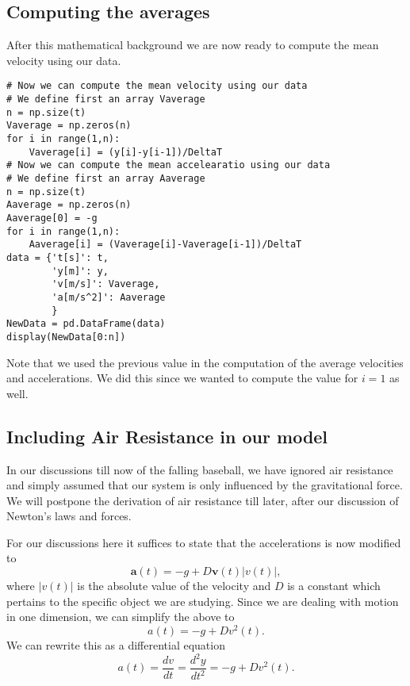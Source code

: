 \documentclass[%
oneside,                 %
final,                   %
10pt]{article}
\begin{document}
\subsection*{Computing the averages}
After this mathematical background we are now ready to compute the mean velocity using our data.





















\begin{verbatim}
# Now we can compute the mean velocity using our data
# We define first an array Vaverage
n = np.size(t)
Vaverage = np.zeros(n)
for i in range(1,n):
    Vaverage[i] = (y[i]-y[i-1])/DeltaT
# Now we can compute the mean accelearatio using our data
# We define first an array Aaverage
n = np.size(t)
Aaverage = np.zeros(n)
Aaverage[0] = -g
for i in range(1,n):
    Aaverage[i] = (Vaverage[i]-Vaverage[i-1])/DeltaT
data = {'t[s]': t,
        'y[m]': y,
        'v[m/s]': Vaverage,
        'a[m/s^2]': Aaverage
        }
NewData = pd.DataFrame(data)
display(NewData[0:n])

\end{verbatim}


Note that we used the previous value in the computation of the average velocities and accelerations. We did this since we wanted to compute the value for $i=1$ as well. 

\subsection*{Including Air Resistance in our model}

In our discussions till now of the falling baseball, we have ignored
air resistance and simply assumed that our system is only influenced
by the gravitational force.  We will postpone the derivation of air
resistance till later, after our discussion of Newton's laws and
forces.

For our discussions here it suffices to state that the accelerations is now modified to
\[
\bm{a}(t) = -g +D\bm{v}(t)\vert v(t)\vert,
\]
where $\vert v(t)\vert$ is the absolute value of the velocity and $D$ is a constant which pertains to the specific object we are studying.
Since we are dealing with motion in one dimension, we can simplify the above to
\[
a(t) = -g +Dv^2(t). 
\]
We can rewrite this as a differential equation
\[
a(t) = \frac{dv}{dt}=\frac{d^2y}{dt^2}= -g +Dv^2(t). 
\]
\end{document}
